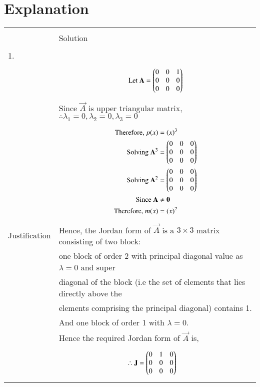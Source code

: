 \documentclass[journal,12pt]{IEEEtran}
\begin{document}
\section{\textbf{Explanation}}
\renewcommand{\thetable}{2}
\begin{longtable}{|l|l|}
\hline
\multirow{3}{*}{} & \\
Statement&Solution\\
\hline
&\\
1.&\\
&\parbox{6cm}{\begin{align*}
    \mbox{Let }\mathbf{A}&=\begin{pmatrix}0&0&1\\0&0&0\\0&0&0\end{pmatrix}\\
\end{align*}}\\
&Since $\vec{A}$ is upper triangular matrix, $\therefore \lambda_{1}=0,\lambda_{2}=0,\lambda_{3}=0$ \\
&\parbox{6cm}{\begin{align*}
    \mbox{Therefore, }p(x)&=(x)^3\\
    \mbox{Solving }\mathbf{A}^3&=\begin{pmatrix}0&0&0\\0&0&0\\0&0&0\end{pmatrix}\\
    \mbox{Solving }\mathbf{A}^2&=\begin{pmatrix}0&0&0\\0&0&0\\0&0&0\end{pmatrix}\\
    \mbox{Since }\mathbf{A}&\neq \mathbf{0}\\
    \mbox{Therefore, }m(x)&=(x)^2\\
    \end{align*}}\\
Justification&Hence, the Jordan form of $\vec{A}$ is a $3 \times 3$ matrix consisting of two block:\\
&one block of order 2 with principal diagonal value as $\lambda = 0$ and super\\
&diagonal of the block (i.e the set of elements that lies directly above the\\
&elements comprising the principal diagonal) contains 1.\\
&And one block of order 1 with $\lambda=0$.\\
&Hence the required Jordan form of $\vec{A}$ is,\\
&\parbox{6cm}{\begin{align*}
    \therefore \vec{J}&=\myvec{0&1&0\\0&0&0\\0&0&0}

\end{align*}}
\end{longtable}
\end{document}
